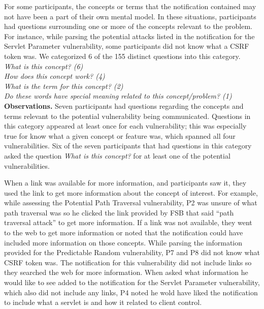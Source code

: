 \documentclass[conference]{IEEEtran}
\begin{document}
For some participants, the concepts or terms that the notification contained may not have been a part of their own mental model. 
In these situations, participants had questions surrounding one or more of the concepts relevant to the problem.
For instance, while parsing the potential attacks listed in the notification for the Servlet Parameter vulnerability, some participants did not know what a CSRF token was.
We categorized 6 of the 155 distinct questions into this category. 
\\

\noindent\emph{What is this concept? (6)} \\
\emph{How does this concept work? (4)} \\
\emph{What is the term for this concept? (2)} \\
\emph{Do these words have special meaning related to this concept/problem? (1)} \\


\noindent\textbf{Observations.}
Seven participants had questions regarding the concepts and terms relevant to the potential vulnerability being communicated. 
Questions in this category appeared at least once for each vulnerability; this was especially true for know what a given concept or feature was, which spanned all four vulnerabilities. 
Six of the seven participants that had questions in this category asked the question \textit{What is this concept?} for at least one of the potential vulnerabilities.


When a link was available for more information, and participants saw it, they used the link to get more information about the concept of interest.
For example, while assessing the Potential Path Traversal vulnerability, P2 was unsure of what path traversal was so he clicked the link provided by FSB that said ``path traversal attack'' to get more information.
If a link was not available, they went to the web to get more information or noted that the notification could have included more information on those concepts.
While parsing the information provided for the Predictable Random vulnerability, P7 and P8 did not know what CSRF token was.
The notification for this vulnerability did not include links so they searched the web for more information. 
When asked what information he would like to see added to the notification for the Servlet Parameter vulnerability, which also did not include any links, P4 noted he wold have liked the notification to include what a servlet is and how it related to client control.
\\
\end{document}
